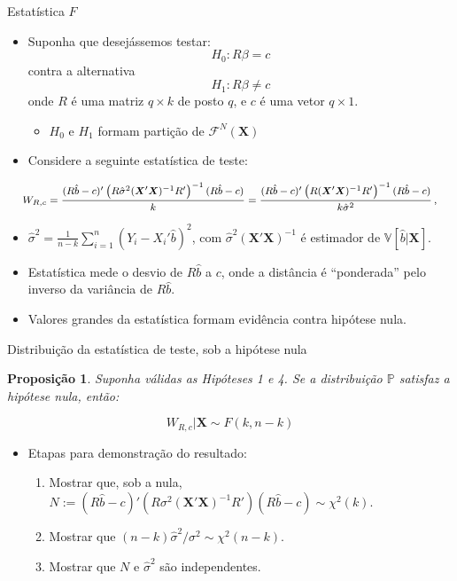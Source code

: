 \documentclass[11pt]{beamer}
\newtheorem{proposition}{Proposição}
\begin{document}
\begin{frame}{Estatística $F$}
	\begin{itemize}
		\item Suponha que desejássemos testar:
		\vspace{-0.5em}
		$$H_0: R\beta = c$$
		\vspace{-0.5em}
		contra a  alternativa
\vspace{-0.5em}
		$$H_1: R\beta \neq c$$
		onde $R$ é uma matriz $q \times k$ de posto $q$, e $c$ é uma vetor $q \times 1$.
		\begin{itemize}
			\item $H_0$ e $H_1$ formam partição de $\mathcal{F}^{N}(\boldsymbol{X})$
		\end{itemize}
		\item Considere a seguinte estatística de teste:
\end{itemize}
\vspace{0.8em}
		$$\footnotesize W_{R,c} = \frac{(R\hat{b}-c)'\left(R\hat{\sigma}^2(\boldsymbol{X}'\boldsymbol{X})^{-1}R'\right)^{-1}(R\hat{b}-c)}{k}  = \frac{(R\hat{b}-c)'\left(R(\boldsymbol{X}'\boldsymbol{X})^{-1}R'\right)^{-1}(R\hat{b}-c)}{k \hat{\sigma}^2}\, ,$$
	
		\begin{itemize}
			\item $\hat{\sigma}^2 = \frac{1}{n-k}\sum_{i=1}^n (Y_i -X_i'\hat{b})^2$, com $\hat{\sigma}^2 (\boldsymbol{X}'\boldsymbol{X})^{-1}$ é estimador de $\mathbb{V}[\hat{b}|\boldsymbol{X}]$.
			\item Estatística mede o desvio de $R\hat{b}$ a $c$, onde a distância é ``ponderada'' pelo inverso da variância de  $R\hat{b}$.
			\item Valores grandes da estatística formam evidência contra hipótese nula.
		\end{itemize}

\end{frame}

\begin{frame}{Distribuição da estatística de teste, sob a hipótese nula}
\begin{proposition}
	Suponha válidas as Hipóteses 1 e  4. Se a distribuição $\mathbb{P}$ satisfaz a hipótese nula, então:
	
	$$W_{R,c}|\boldsymbol{X}\sim F(k,n-k)$$
\end{proposition}
\begin{itemize}
	\item Etapas para demonstração do resultado:
	\begin{enumerate}
		\item Mostrar que, sob a nula, $N := (R\hat{b}-c)'\left(R\sigma^2(\boldsymbol{X}'\boldsymbol{X})^{-1}R'\right)(R\hat{b}-c) \sim \chi^2(k)$.
		\item Mostrar que $(n-k)\hat{\sigma}^2/\sigma^2 \sim \chi^2(n-k)$.
		\item Mostrar que $N$ e $\hat{\sigma}^2$ são independentes.
	\end{enumerate}
\end{itemize}
\end{frame}
\end{document}
